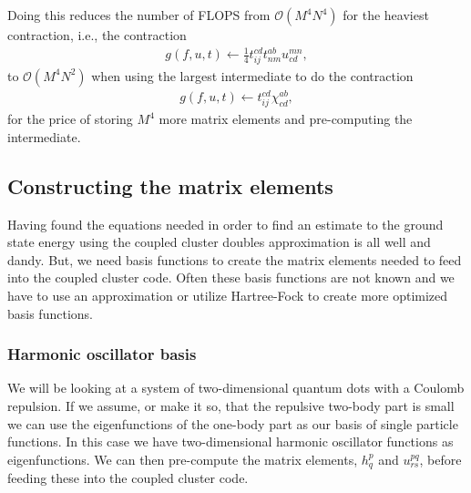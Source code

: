 \documentclass[
    a4paper, aps, twocolumn, floatfix, superscriptaddress,
    nofootinbib]{revtex4-1}
\newcommand{\1}{\mathds{1}}
\begin{document}
            Doing this reduces the number of FLOPS from $\mathcal{O}(M^4N^4)$
            for the heaviest contraction, i.e., the contraction
            \begin{align}
                g(f, u, t) \gets
                \frac{1}{4}t^{cd}_{ij}t^{ab}_{nm}u^{mn}_{cd},
            \end{align}
            to $\mathcal{O}(M^4N^2)$ when using the largest intermediate to do
            the contraction
            \begin{align}
                g(f, u, t) \gets t^{cd}_{ij}\chi^{ab}_{cd},
            \end{align}
            for the price of storing $M^4$ more matrix elements and
            pre-computing the intermediate.

    \subsection{Constructing the matrix elements}
        Having found the equations needed in order to find an estimate to the
        ground state energy using the coupled cluster doubles approximation is
        all well and dandy. But, we need basis functions to create the matrix
        elements needed to feed into the coupled cluster code.  Often these
        basis functions are not known and we have to use an approximation or
        utilize Hartree-Fock to create more optimized basis functions.

        \subsubsection{Harmonic oscillator basis}
            We will be looking at a system of two-dimensional quantum dots with
            a Coulomb repulsion.  If we assume, or make it so, that the
            repulsive two-body part is small we can use the eigenfunctions of
            the one-body part as our basis of single particle functions. In this
            case we have two-dimensional harmonic oscillator functions as
            eigenfunctions. We can then pre-compute the matrix elements, $h_q^p$
            and $u_{rs}^{pq}$, before feeding these into the coupled cluster
            code.
\end{document}
